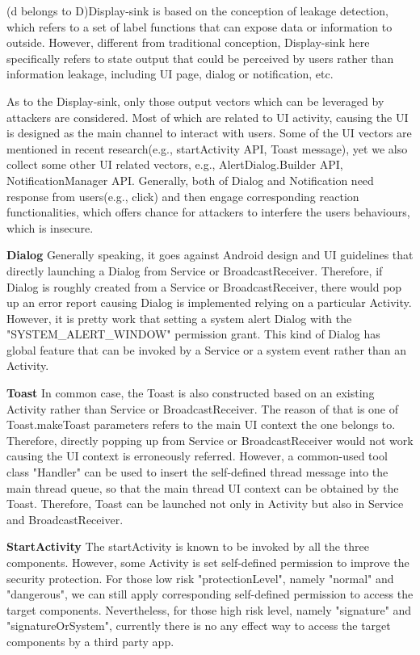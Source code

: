 \documentclass{sig-alternate-05-2015}
\begin{document}
(d belongs to D)Display-sink is based on the conception of leakage detection, which refers to a set of label functions that can expose data or information to outside. However, different from traditional conception, Display-sink here specifically refers to state output that could be perceived by users rather than information leakage, including UI page, dialog or notification, etc.

As to the Display-sink, only those output vectors which can be leveraged by attackers are considered. Most of which are related to UI activity, causing the UI is designed as the main channel to interact with users. Some of the UI vectors are mentioned in recent research\cite{bianchi2015app}(e.g., startActivity API, Toast message), yet we also collect some other UI related vectors, e.g., AlertDialog.Builder API, NotificationManager API. Generally, both of Dialog and Notification need response from users(e.g., click) and then engage corresponding reaction functionalities, which offers chance for attackers to interfere the users behaviours, which is insecure.

\textbf{Dialog}
Generally speaking, it goes against Android design and UI guidelines that directly launching a Dialog from Service or BroadcastReceiver. Therefore, if Dialog is roughly created from a Service or BroadcastReceiver, there would pop up an error report causing Dialog is implemented relying on a particular Activity. However, it is pretty work that setting a system alert Dialog with the "SYSTEM\_ALERT\_WINDOW" permission grant. This kind of Dialog has global feature that can be invoked by a Service or a system event rather than an Activity. 

\textbf{Toast}
In common case, the Toast is also constructed based on an existing Activity rather than Service or BroadcastReceiver. The reason of that is one of Toast.makeToast parameters refers to the main UI context the one belongs to. Therefore, directly popping up from Service or BroadcastReceiver would not work causing the UI context is erroneously referred. However, a common-used tool class "Handler" can be used to insert the self-defined thread message into the main thread queue, so that the main thread UI context can be obtained by the Toast. Therefore, Toast can be launched not only in Activity but also in Service and BroadcastReceiver.

\textbf{StartActivity}
The startActivity is known to be invoked by all the three components. However, some Activity is set self-defined permission to improve the security protection. For those low risk "protectionLevel", namely "normal" and "dangerous", we can still apply corresponding self-defined permission to access the target components. Nevertheless, for those high risk level, namely "signature" and "signatureOrSystem", currently there is no any effect way to access the target components by a third party app.
\end{document}
